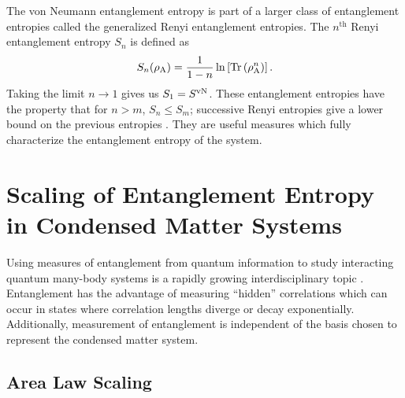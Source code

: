 The von Neumann entanglement entropy is part of a larger class of entanglement entropies called the generalized Renyi entanglement entropies.
The $n^\text{th}$ Renyi entanglement entropy $S_n$ is defined as
\begin{equation} \label{renyi}
 	S_n(\rho_{\rm A}) = \frac{1}{1-n}\ln\left[{\rm Tr}\left( \rho_{\rm A}^n \right) \right].
\end{equation}
Taking the limit $n\to1$ gives us $S_1 = S^{\text{vN}}$.  These entanglement entropies have the property that for $n>m$, $S_n\le S_m$; successive Renyi entropies give a lower bound on the previous entropies \cite{renyiproof}. They are useful measures which fully characterize the entanglement entropy of the system.

\section{Scaling of Entanglement Entropy in Condensed Matter Systems}

Using measures of entanglement from quantum information to study interacting quantum many-body systems is a rapidly growing interdisciplinary topic \cite{Amico, intro}.
Entanglement has the advantage of measuring ``hidden'' correlations which can occur in states where correlation lengths diverge or decay exponentially.
Additionally, measurement of entanglement is independent of the basis chosen to represent the condensed matter system.


\subsection{Area Law Scaling}

